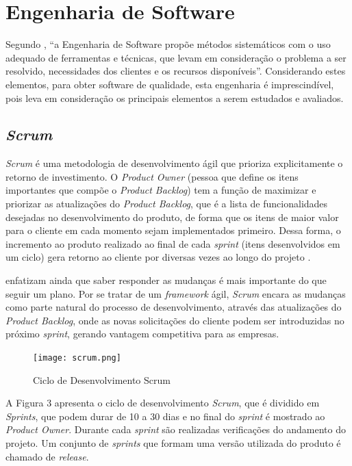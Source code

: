 \documentclass[
	12pt,				%
    oneside,			%
	a4paper,			%
	english,			%
	french,				%
	spanish,			%
	brazil,				%
	]{abntex2}
\begin{document}
\section{Engenharia de Software}
Segundo , “a Engenharia de Software propõe métodos
sistemáticos com o uso adequado de ferramentas e técnicas, que levam em
consideração o problema a ser resolvido, necessidades dos clientes e os recursos
disponíveis”. Considerando estes elementos, para obter software de qualidade, esta
engenharia é imprescindível, pois leva em consideração os principais elementos a
serem estudados e avaliados.


\subsection{\textit{Scrum}}
\textit{Scrum} é uma metodologia de desenvolvimento ágil que prioriza explicitamente
o retorno de investimento. O \textit{Product Owner} (pessoa que define os itens importantes
que compõe o \textit{Product Backlog}) tem a função de maximizar e priorizar as atualizações
do \textit{Product Backlog}, que é a lista de funcionalidades desejadas no desenvolvimento
do produto, de forma que os itens de maior valor para o cliente em cada momento
sejam implementados primeiro. Dessa forma, o incremento ao produto realizado ao
final de cada \textit{sprint} (itens desenvolvidos em um ciclo) gera retorno ao cliente por
diversas vezes ao longo do projeto \cite{machado}. 

 enfatizam ainda que saber responder as mudanças é mais
importante do que seguir um plano. Por se tratar de um \textit{framework} ágil, \textit{Scrum} encara 
as mudanças como parte natural do processo de desenvolvimento, através das
atualizações do \textit{Product Backlog}, onde as novas solicitações do cliente podem ser
introduzidas no próximo \textit{sprint}, gerando vantagem competitiva para as empresas.

\begin{figure} [hbt] 
\label{figura1} 
\caption{Ciclo de Desenvolvimento Scrum \cite{vascharim}}
\begin{center}
\texttt{[image: scrum.png]}
\end{center}
\end{figure}

A Figura 3 apresenta o ciclo de desenvolvimento \textit{Scrum}, que é dividido em
\textit{Sprints}, que podem durar de 10 a 30 dias e no final do \textit{sprint} é mostrado ao \textit{Product
Owner}. Durante cada \textit{sprint} são realizadas verificações do andamento do projeto. Um
conjunto de \textit{sprints} que formam uma versão utilizada do produto é chamado de
\textit{release}.
\end{document}
